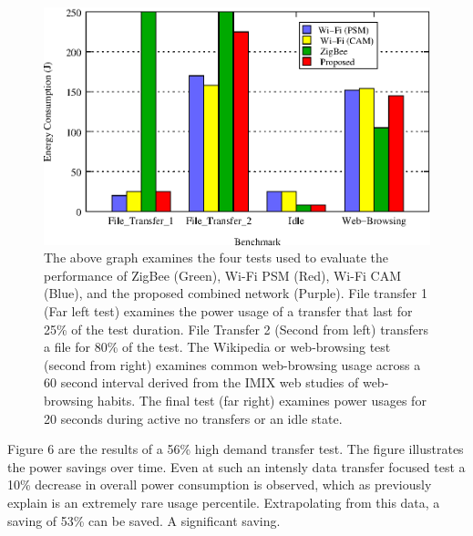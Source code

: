\documentclass[conference]{IEEEtran}
\begin{document}
\begin{figure}
\begin{center}
\includegraphics[scale=0.65]{woot.eps}
\caption{The above graph examines the four tests used to evaluate the performance of ZigBee (Green), Wi-Fi PSM (Red), Wi-Fi CAM (Blue), and the proposed combined network (Purple).  File transfer 1 (Far left test) examines the power usage of a transfer that last for 25\% of the test duration.  File Transfer 2 (Second from left) transfers a file for 80\% of the test. The Wikipedia or web-browsing test (second from right) examines common web-browsing usage across a 60 second interval derived from the IMIX web studies of web-browsing habits. \cite{twelve}  The final test (far right) examines power usages for 20 seconds during active no transfers or an idle state.}
\end{center}
\end{figure}

Figure 6 are the results of a 56\% high demand transfer test.  The figure illustrates the power savings over time.  Even at such an intensly data transfer focused test a 10\% decrease in overall power consumption is observed, which as previously explain is an extremely rare usage percentile.  Extrapolating from this data, a saving of 53\% can be saved.  A significant saving.
\end{document}
